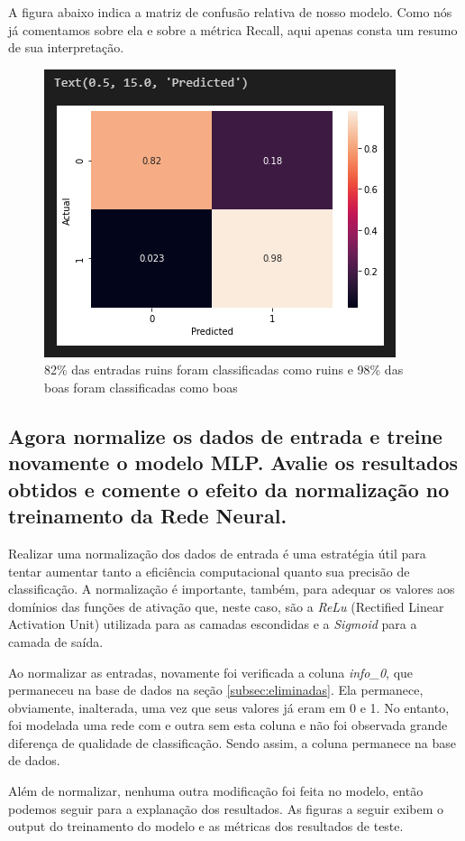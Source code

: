\documentclass[12pt]{article}
\begin{document}
A figura abaixo indica a matriz de confusão relativa de nosso modelo. Como nós já comentamos sobre ela e sobre a métrica Recall, aqui apenas consta um resumo de sua interpretação.
\begin{figure}[H]
	\centering
	\includegraphics[width=0.5\linewidth]{Imagens/ConfusionMatrizNaoNormalizado}
	\caption{82\% das entradas ruins foram classificadas como ruins e 98\% das boas foram classificadas como boas}
	\label{fig:confusionmatriznaonormalizado}
\end{figure}




\subsection{Agora normalize os dados de entrada e treine novamente o modelo MLP.	Avalie os resultados obtidos e comente o efeito da normalização no	treinamento da Rede Neural.}
	
Realizar uma normalização dos dados de entrada é uma estratégia útil para tentar aumentar tanto a eficiência computacional quanto sua precisão de classificação. A normalização é importante, também, para adequar os valores aos domínios das funções de ativação que, neste caso, são a \textit{ReLu} (Rectified Linear Activation Unit) utilizada para as camadas escondidas e a \textit{Sigmoid} para a camada de saída.

Ao normalizar as entradas, novamente foi verificada a coluna \textit{info\_0}, que permaneceu na base de dados na seção \ref{subsec:eliminadas}. Ela permanece, obviamente, inalterada, uma vez que seus valores já eram em 0 e 1. No entanto, foi modelada uma rede com e outra sem esta coluna e não foi observada grande diferença de qualidade de classificação. Sendo assim, a coluna permanece na base de dados.

Além de normalizar, nenhuma outra modificação foi feita no modelo, então podemos seguir para a explanação dos resultados. As figuras a seguir exibem o output do treinamento do modelo e as métricas dos resultados de teste.
\end{document}
